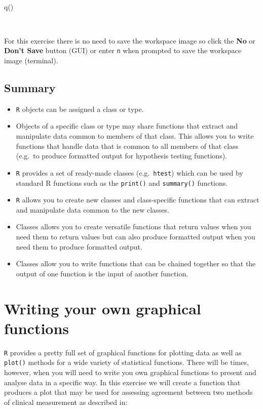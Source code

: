 \documentclass[
  12pt,
  a4paper]{book}
\newenvironment{Shaded}{\begin{snugshade}}{\end{snugshade}}
\newcommand{\FunctionTok}[1]{\textcolor[rgb]{0.00,0.00,0.00}{#1}}
\newcommand{\NormalTok}[1]{#1}
\begin{document}
~

\begin{Shaded}
\begin{Highlighting}[]
\FunctionTok{q}\NormalTok{()}
\end{Highlighting}
\end{Shaded}

~

For this exercise there is no need to save the workspace image so click the \textbf{No} or \textbf{Don't Save} button (GUI) or enter \texttt{n} when prompted to save the workspace image (terminal).

\hypertarget{summary-5}{%
\section{Summary}\label{summary-5}}

\begin{itemize}
\item
  \texttt{R} objects can be assigned a class or type.
\item
  Objects of a specific class or type may share functions that extract and manipulate data common to members of that class. This allows you to write functions that handle data that is common to all members of that class (e.g.~to produce formatted output for hypothesis testing functions).
\item
  \texttt{R} provides a set of ready-made classes (e.g.~\texttt{htest}) which can be used by standard R functions such as the \texttt{print()} and \texttt{summary()} functions.
\item
  \texttt{R} allows you to create new classes and class-specific functions that can extract and manipulate data common to the new classes.
\item
  Classes allows you to create versatile functions that return values when you need them to return values but can also produce formatted output when you need them to produce formatted output.
\item
  Classes allow you to write functions that can be chained together so that the output of one function is the input of another function.
\end{itemize}

\hypertarget{exercise7}{%
\chapter{Writing your own graphical functions}\label{exercise7}}

\texttt{R} provides a pretty full set of graphical functions for plotting data as well as \texttt{plot()} methods for a wide variety of statistical functions. There will be times, however, when you will need to write you own graphical functions to present and analyse data in a specific way. In this exercise we will create a function that produces a plot that may be used for assessing agreement between two methods of clinical measurement as described in:
\end{document}
